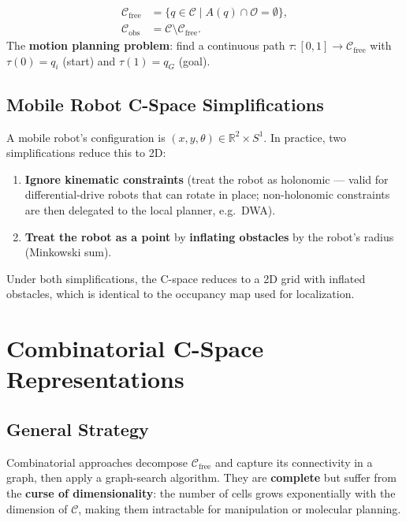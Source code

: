 \documentclass[11pt,a4paper]{article}
\theoremstyle{definition}
\theoremstyle{plain}
\theoremstyle{remark}
\begin{document}
\begin{tcolorbox}[colback=blue!5!white,colframe=blue!75!black,title=\textbf{Configuration Space Partition}]
\begin{align*}
    \mathcal{C}_{\mathrm{free}} &= \{q \in \mathcal{C} \mid A(q) \cap \mathcal{O} = \emptyset\}, \\
    \mathcal{C}_{\mathrm{obs}}  &= \mathcal{C} \setminus \mathcal{C}_{\mathrm{free}}.
\end{align*}
The \textbf{motion planning problem}: find a continuous path $\tau : [0,1] \to \mathcal{C}_{\mathrm{free}}$ with $\tau(0) = q_i$ (start) and $\tau(1) = q_G$ (goal).
\end{tcolorbox}

\subsection{Mobile Robot C-Space Simplifications}

A mobile robot's configuration is $(x, y, \theta) \in \mathbb{R}^2 \times S^1$. In practice, two simplifications reduce this to 2D:
\begin{enumerate}
    \item \textbf{Ignore kinematic constraints} (treat the robot as holonomic — valid for differential-drive robots that can rotate in place; non-holonomic constraints are then delegated to the local planner, e.g.\ DWA).
    \item \textbf{Treat the robot as a point} by \textbf{inflating obstacles} by the robot's radius (Minkowski sum).
\end{enumerate}
Under both simplifications, the C-space reduces to a 2D grid with inflated obstacles, which is identical to the occupancy map used for localization.

\section{Combinatorial C-Space Representations}

\subsection{General Strategy}

Combinatorial approaches decompose $\mathcal{C}_{\mathrm{free}}$ and capture its connectivity in a graph, then apply a graph-search algorithm. They are \textbf{complete} but suffer from the \textbf{curse of dimensionality}: the number of cells grows exponentially with the dimension of $\mathcal{C}$, making them intractable for manipulation or molecular planning.
\end{document}
